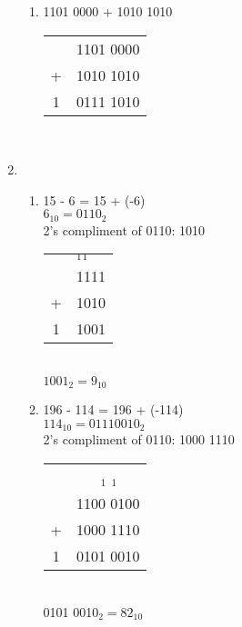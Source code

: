 \documentclass[a4paper]{article}
\begin{document}
\begin{enumerate}
\begin{enumerate}
            \item 1101 0000 + 1010 1010 \\
            \begin{tabular}{ c r }
                & 1101 0000\\  
              + & 1010 1010\\ \hline
              1 & 0111 1010
          \end{tabular} \\
        
        \end{enumerate}

        \item
        \begin{enumerate}

            
            \item 15 - 6 = 15 + (-6) \\ 
            $6_{10} = 0110_{2}$ \\
            2's compliment of 0110: 1010 \\
            \begin{tabular}{ c l }
                & $_{1}$$_{1}$ \\
                & 1111 \\  
              + & 1010 \\ \hline
              1 & 1001 \\
            \end{tabular} \\

            $1001_{2} = 9_{10}$ \\

            \item 196 - 114 = 196 + (-114) \\
            $114_{10} = 0111 0010_{2}$ \\
            2's compliment of 0110: 1000 1110 \\
            \begin{tabular}{ c l }
                & $\:\:\:\:\:\:$ $_{1}$ $_{1}$ \\
                & 1100 0100 \\  
              + & 1000 1110 \\ \hline
              1 & 0101 0010 \\
            \end{tabular} \\

            0101 0010$_{2} = 82_{10}$ \\


\end{enumerate}
\end{enumerate}
\end{document}
